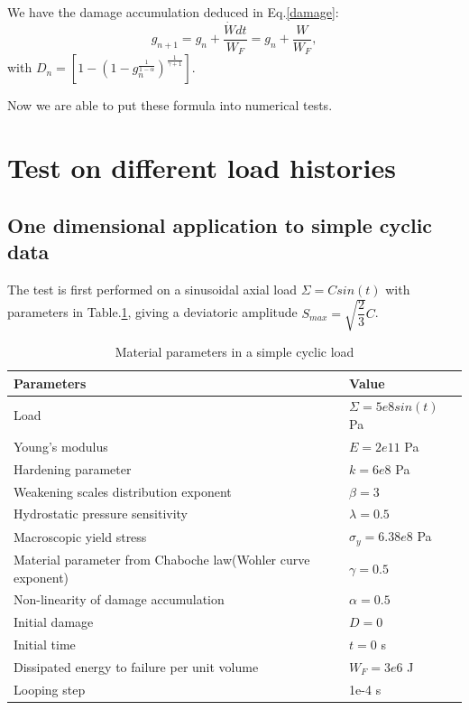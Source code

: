 \documentclass[3p,times,number,review]{elsarticle}
\begin{document}
We have the damage accumulation deduced in Eq.\eqref{damage}:
$$g_{n+1}=g_n+\dfrac{\dot{W}dt}{W_F}=g_n+\dfrac{W}{W_F},$$
with $D_n=\left[1-\left(1-g_n^{\frac{1}{1-\alpha}} \right)^{\frac{1}{\gamma+1}}  \right]. $
 
 Now we are able to put these formula into numerical tests.
 
\section{Test on different load histories}
\subsection{One dimensional application to simple cyclic data}
The test is first performed on a sinusoidal axial load $\Sigma=Csin(t)$ with parameters in Table.\ref{Sin}, giving a deviatoric amplitude $S_{max}=\sqrt{\dfrac{2}{3}}C$.
\begin{table}[!h]
	\centering
	\begin{tabular}{ll}
		\hline
		\textbf{Parameters}                                         & \textbf{Value}                    \\ \hline
		Load                                                              & $\Sigma=5e8sin(t)$ Pa                  \\
		Young's modulus                                             & $E=2e11$ Pa                       \\
		Hardening parameter                                         &  $k=6e8$ Pa \\
		Weakening scales distribution exponent                      & $\beta=3$                             \\
		Hydrostatic pressure sensitivity                            & $\lambda=0.5$                     \\
		Macroscopic yield stress                                    & $\sigma_y=6.38e8$ Pa              \\
		Material parameter from Chaboche law(Wohler curve exponent) & $\gamma=0.5$                        \\
		Non-linearity of damage accumulation & $\alpha=0.5$                        \\
		Initial damage                                              & $D=0$                          \\
		Initial time                                                & $t=0$ s                            \\
		Dissipated energy to failure per unit volume                & $W_F=3e6$ J                       \\
		Looping step                                           & 1e-4 s              \\ \hline
	\end{tabular}
		\caption{Material parameters in a simple cyclic load }
		\label{Sin}
\end{table}
\end{document}
